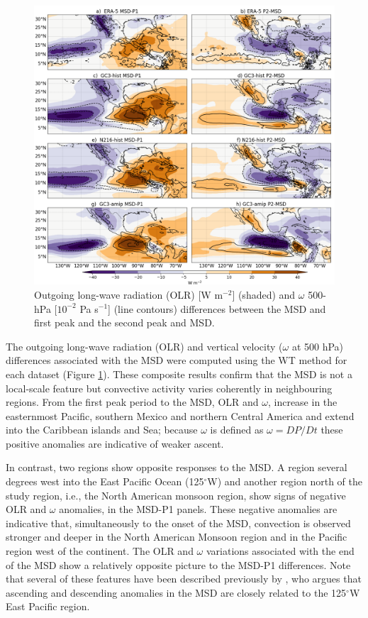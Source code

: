  \begin{figure}[t!]
\includegraphics[width=\linewidth]{figures/fig4_olrv_3.png}
\caption[OLR and vertical velocity composites]{Outgoing long-wave radiation (OLR) [W m$^{-2}$] (shaded) and $\omega$ 500-hPa [$10^{-2}$ Pa s$^{-1}$] (line contours) differences between the MSD and first peak and the second peak and MSD.}
\label{fig:olranom}
\end{figure}

 The outgoing long-wave radiation (OLR) and vertical velocity ($\omega$ at 500 hPa) differences associated with the MSD were computed using the WT method for each dataset (Figure \ref{fig:olranom}). These composite results confirm that the MSD is not a local-scale feature but convective activity varies coherently in neighbouring regions. From the first peak period to the MSD, OLR and $\omega$, increase in the easternmost Pacific, southern Mexico and northern Central America and extend into the Caribbean islands and Sea; because $\omega$ is defined as $\omega=DP/Dt$  these positive anomalies are indicative of weaker ascent. 
 
 In contrast, two regions show opposite responses to the MSD. A region several degrees west into the East Pacific Ocean (125$^\circ$W) and another region north of the study region, i.e., the North American monsoon region, show signs of negative OLR and $\omega$ anomalies, in the MSD-P1 panels. These negative anomalies are indicative that, simultaneously to the onset of the MSD,  convection is observed stronger and deeper in the North American Monsoon region and in the Pacific region west of the continent.  
 The OLR and $\omega$ variations associated with the end of the MSD show a relatively opposite picture to the MSD-P1 differences. Note that several of these features have been described previously by \cite{herrera2015}, who argues that ascending and descending anomalies in the MSD are closely related to the 125$^\circ$W East Pacific region.
 
